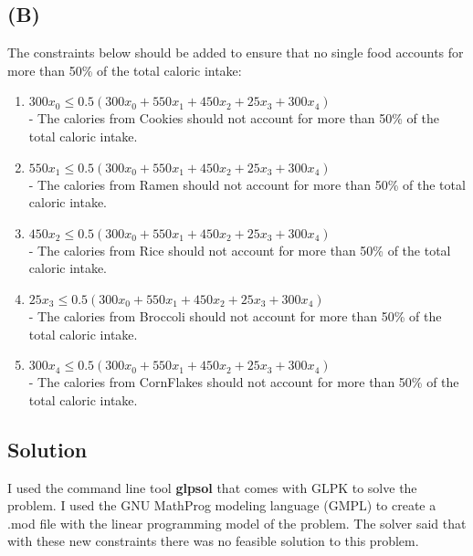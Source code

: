 \documentclass[12pt]{article}
\begin{document}
\subsection*{(B)}
The constraints below should be added to ensure that no single food accounts for more than 50\% of the total caloric intake:
\begin{enumerate}
\itemsep0em
  \item $300x_{0} \leq 0.5(300x_{0} + 550x_{1} + 450x_{2} + 25x_{3} + 300x_{4})$\\
  - The calories from Cookies should not account for more than 50\% of the total caloric intake. 
  \item $550x_{1} \leq 0.5(300x_{0} + 550x_{1} + 450x_{2} + 25x_{3} + 300x_{4})$\\
  - The calories from Ramen should not account for more than 50\% of the total caloric intake. 
  \item $450x_{2} \leq 0.5(300x_{0} + 550x_{1} + 450x_{2} + 25x_{3} + 300x_{4})$\\
  - The calories from Rice should not account for more than 50\% of the total caloric intake. 
  \item $25x_{3} \leq 0.5(300x_{0} + 550x_{1} + 450x_{2} + 25x_{3} + 300x_{4})$\\
  - The calories from Broccoli should not account for more than 50\% of the total caloric intake. 
  \item $300x_{4} \leq 0.5(300x_{0} + 550x_{1} + 450x_{2} + 25x_{3} + 300x_{4})$\\
  - The calories from CornFlakes should not account for more than 50\% of the total caloric intake.
\end{enumerate}

\subsection*{Solution}
I used the command line tool \textbf{glpsol} that comes with GLPK to solve the problem.  I used the GNU MathProg modeling language (GMPL) to create a .mod file with the linear programming model of the problem.  The solver said that with these new constraints there was no feasible solution to this problem.


\newpage








\end{document}
